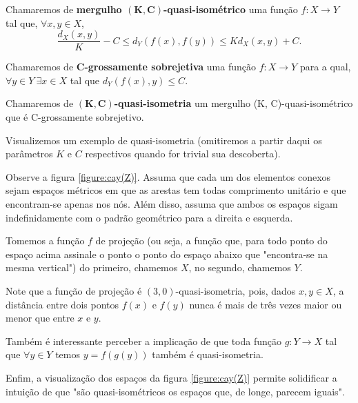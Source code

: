 \begin{definition}
Chamaremos de \textbf{mergulho $\mathbf{(K, C)}$-quasi-isométrico} uma função $f:X \rightarrow Y$ tal que, $\forall x, y \in X$,
\[
\frac{d_X(x, y)}{K} - C \leq d_Y(f(x), f(y)) \leq K d_X(x, y) + C.
\]
\end{definition}
\begin{definition}
Chamaremos de \textbf{$\mathbf{C}$-grossamente sobrejetiva} uma função $f:X \rightarrow Y$ para a qual, $\forall y \in Y \ \exists x \in X$ tal que $d_Y(f(x), y) \leq C$.
\end{definition}
\begin{definition}
Chamaremos de \textbf{$\mathbf{(K, C)}$-quasi-isometria} um mergulho (K, C)-quasi-isométrico que é C-grossamente sobrejetivo.
\end{definition}

Visualizemos um exemplo de quasi-isometria (omitiremos a partir daqui os parâmetros $K$ e $C$ respectivos quando for trivial sua descoberta).

Observe a figura \ref{figure:cay(Z)}. Assuma que cada um dos elementos conexos sejam espaços métricos em que as arestas tem todas comprimento unitário e que encontram-se apenas nos nós. Além disso, assuma que ambos os espaços sigam indefinidamente com o padrão geométrico para a direita e esquerda.

Tomemos a função $f$ de projeção (ou seja, a função que, para todo ponto do espaço acima assinale o ponto o ponto do espaço abaixo que "encontra-se na mesma vertical") do primeiro, chamemos $X$, no segundo, chamemos $Y$.

Note que a função de projeção é $(3,0)$-quasi-isometria, pois, dados $x, y \in X$, a distância entre dois pontos $f(x)$ e $f(y)$ nunca é mais de três vezes maior ou menor que entre $x$ e $y$.

Também é interessante perceber a implicação de que toda função $g: Y \rightarrow X$ tal que $\forall y \in Y$ temos $y = f(g(y))$ também é quasi-isometria.

Enfim, a visualização dos espaços da figura \ref{figure:cay(Z)} permite solidificar a intuição de que "são quasi-isométricos os espaços que, de longe, parecem iguais".

